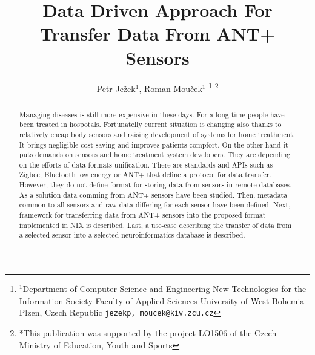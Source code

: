 \documentclass[conference]{IEEEconf}
\begin{document}
  \title{Data Driven Approach For Transfer Data  From ANT+ Sensors}

  \author{{Petr Je\v{z}ek$^{1}$, Roman Mou\v{c}ek$^{1}$}
\thanks{$^{1}$Department of Computer Science and Engineering
New Technologies for the Information Society
Faculty of Applied Sciences
University of West Bohemia
Plzen, Czech Republic
        {\tt\small {jezekp, moucek}@kiv.zcu.cz}}%
\thanks{*This publication was supported by the project LO1506 of the Czech Ministry of Education, Youth and Sports}%
}
\maketitle



\begin{abstract}
Managing diseases is still more expensive in these days. For a long time people have been treated in hospotals. Fortunatelly current situation is changing also thanks to relatively cheap body sensors and raising development of systems for home treathment. It brings negligible cost saving and improves patients compfort. On the other hand it puts demands on sensors and home treatment system developers. They are depending on the efforts of data formats unification. There are standards and APIs such as Zigbee, Bluetooth low energy or ANT+ that define a protocol for data transfer. However, they do not define format for storing data from sensors in remote databases. As a solution data comming from ANT+ sensors have been studied. Then, metadata common to all sensors and raw data differing for each sensor have been defined. Next, framework for transferring data from ANT+ sensors into the proposed format implemented in NIX is described. Last, a use-case describing the transfer of data from a selected sensor into a selected neuroinformatics database is described.
\end{abstract}
\end{document}
